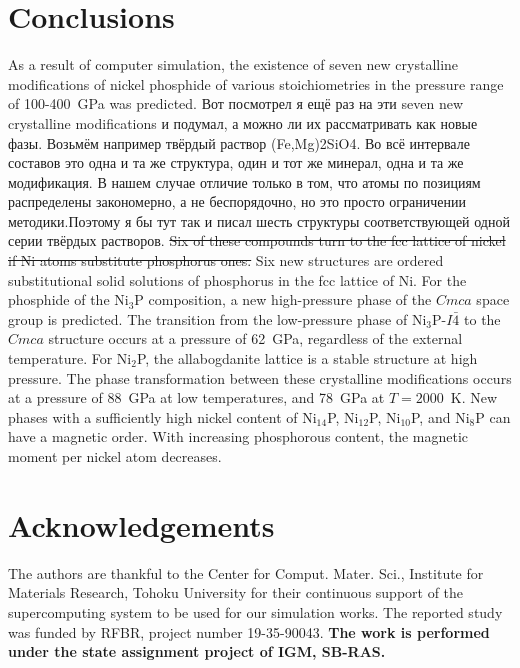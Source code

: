 \documentclass[twoside,twocolumn,9pt]{article}
\begin{document}
\section{Conclusions}
As a result of computer simulation, the existence of seven new crystalline modifications of nickel phosphide of various stoichiometries in the pressure range of 100-400~GPa was predicted. 
{\color{red}Вот посмотрел я ещё раз на эти seven new crystalline modifications и подумал, а можно ли их рассматривать как новые фазы. Возьмём например твёрдый раствор (Fe,Mg)2SiO4. Во всё интервале составов это одна и та же структура, один и тот же минерал, одна и та же модификация. В нашем случае отличие только в том, что атомы по позициям распределены закономерно, а не беспорядочно, но это просто ограничении методики.Поэтому я бы тут так и писал шесть структуры соответствующей одной серии твёрдых растворов.}
\st{Six of these compounds turn to the fcc lattice of nickel if Ni atoms substitute phosphorus ones.} 
{\color{blue} Six new structures are ordered substitutional solid solutions of phosphorus in the fcc lattice of Ni.} 
For the phosphide of the Ni$_3$P composition, a new high-pressure phase of the $Cmca$ space group is predicted. 
The transition from the low-pressure phase of Ni$_3$P-$I\bar{4}$ to the $Cmca$ structure occurs at a pressure of 62~GPa, regardless of the external temperature. 
For Ni$_2$P, the allabogdanite lattice is a stable structure at high pressure. 
The phase transformation between these crystalline modifications occurs at a pressure of 88~GPa at low temperatures, and 78~GPa at $T=2000$~K. 
New phases with a sufficiently high nickel content of Ni$_{14}$P, Ni$_{12}$P, Ni$_{10}$P, and Ni$_8$P can have a magnetic order. 
With increasing phosphorous content, the magnetic moment per nickel atom decreases. 

\section*{Acknowledgements}

The authors are thankful to the Center for Comput. Mater. Sci., Institute for Materials Research, Tohoku University for their continuous support of the supercomputing system to be used for our simulation works. 
The reported study was funded by RFBR, project number 19-35-90043. 
\textbf {The work is performed under the state assignment project of IGM, SB-RAS.}

\balance
\end{document}
